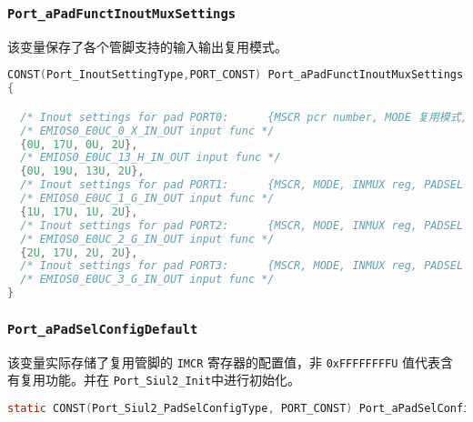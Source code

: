 \subsubsection{\lstinline{Port_aPadFunctInoutMuxSettings}}
该变量保存了各个管脚支持的输入输出复用模式。

\begin{lstlisting}[language=C,style=C]
CONST(Port_InoutSettingType,PORT_CONST) Port_aPadFunctInoutMuxSettings[PORT_INOUT_TABLE_NUM_ENTRIES_U16] = 
{

  /* Inout settings for pad PORT0:      {MSCR pcr number, MODE 复用模式, INMUX reg IMCR REG offset 512, PADSEL val} */
  /* EMIOS0_E0UC_0_X_IN_OUT input func */
  {0U, 17U, 0U, 2U}, 
  /* EMIOS0_E0UC_13_H_IN_OUT input func */
  {0U, 19U, 13U, 2U}, 
  /* Inout settings for pad PORT1:      {MSCR, MODE, INMUX reg, PADSEL val} */
  /* EMIOS0_E0UC_1_G_IN_OUT input func */
  {1U, 17U, 1U, 2U}, 
  /* Inout settings for pad PORT2:      {MSCR, MODE, INMUX reg, PADSEL val} */
  /* EMIOS0_E0UC_2_G_IN_OUT input func */
  {2U, 17U, 2U, 2U}, 
  /* Inout settings for pad PORT3:      {MSCR, MODE, INMUX reg, PADSEL val} */
  /* EMIOS0_E0UC_3_G_IN_OUT input func */
}

\end{lstlisting}

\subsubsection{\lstinline{Port_aPadSelConfigDefault}}
该变量实际存储了复用管脚的 \lstinline{IMCR} 寄存器的配置值，非 \lstinline{0xFFFFFFFFU} 值代表含有复用功能。并在 \lstinline{Port_Siul2_Init}中进行初始化。

\begin{lstlisting}[language=C,style=C]
static CONST(Port_Siul2_PadSelConfigType, PORT_CONST) Port_aPadSelConfigDefault[PORT_NMBR_INMUX_REGS_U16] = {};
\end{lstlisting}